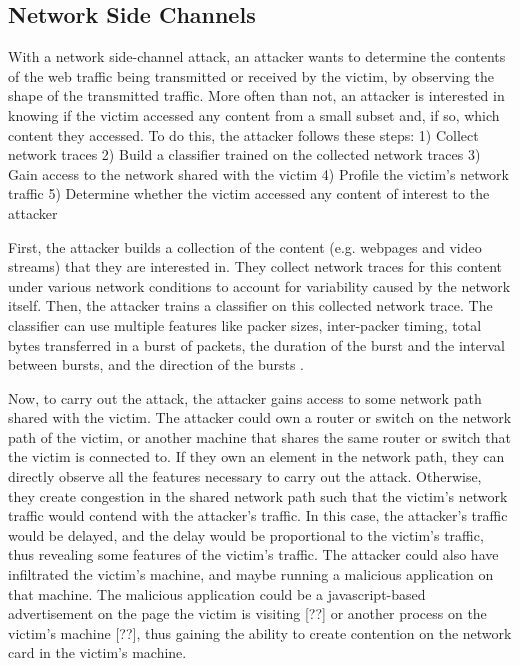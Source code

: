 \subsection{Network Side Channels}
\label{subsec:netshaper-background-network-side-channels}

With a network side-channel attack, an attacker wants to determine the contents of the web traffic being transmitted or received by the victim, by observing the shape of the transmitted traffic.
More often than not, an attacker is interested in knowing if the victim accessed any content from a small subset and, if so, which content they accessed.
To do this, the attacker follows these steps: 
1) Collect network traces
2) Build a classifier trained on the collected network traces
3) Gain access to the network shared with the victim
4) Profile the victim's network traffic
5) Determine whether the victim accessed any content of interest to the attacker

First, the attacker builds a collection of the content (e.g. webpages and video streams) that they are interested in. 
They collect network traces for this content under various network conditions to account for variability caused by the network itself. 
Then, the attacker trains a classifier on this collected network trace.
The classifier can use multiple features like packer sizes, inter-packer timing, total bytes transferred in a burst of packets, the duration of the burst and the interval between bursts, and the direction of the bursts \cite{schuster2017beautyburst}.

Now, to carry out the attack, the attacker gains access to some network path shared with the victim.
The attacker could own a router or switch on the network path of the victim, or another machine that shares the same router or switch that the victim is connected to.
If they own an element in the network path, they can directly observe all the features necessary to carry out the attack. 
Otherwise, they create congestion in the shared network path such that the victim's network traffic would contend with the attacker's traffic.
In this case, the attacker's traffic would be delayed, and the delay would be proportional to the victim's traffic, thus revealing some features of the victim's traffic.
The attacker could also have infiltrated the victim's machine, and maybe running a malicious application on that machine.
The malicious application could be a javascript-based advertisement on the page the victim is visiting [??] or another process on the victim's machine [??], thus gaining the ability to create contention on the network card in the victim's machine. 


